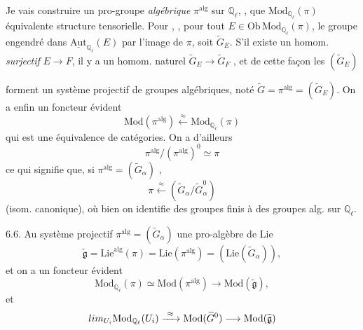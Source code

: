 \documentclass[11pt,a4paper]{article}
\begin{document}
 Je vais construire un pro-groupe \emph{algébrique} 
$\pi^{\mathrm{alg}}$ sur $\mathbb{Q}_\ell$,
\struck{$\pi$} ,  que $\mathrm{Mod}_{\mathbb{Q}_\ell}(\pi)$
 équivalente \ill{} structure tensorielle. Pour ,
\ill{} , pour tout $E \in \mathrm{Ob}\,\mathrm{Mod}_{\mathbb{Q}_\ell}(\pi)$,
le groupe  engendré dans $\underline{\mathrm{Aut}}_{\mathbb{Q}_\ell}(E)$
par l'image de $\pi$, soit $\widetilde{G}_E$. S'il existe un homom.
\emph{surjectif} $E \to F$, il y a un homom. naturel $\widetilde{G}_E \to \widetilde{G}_F$
, et de cette façon les $(\widetilde{G}_E)$

forment un système projectif de groupes algébriques, noté
$\widetilde{G} = \pi^{\mathrm{alg}} = (\widetilde{G}_E)$. On a enfin un foncteur évident
\[
  \mathrm{Mod}(\pi^{\mathrm{alg}}) \xleftarrow{\ \approx\ } \mathrm{Mod}_{\mathbb{Q}_\ell}(\pi)
\]
qui est une équivalence de catégories. On a d'ailleurs
\[
  \pi^{\mathrm{alg}}/(\pi^{\mathrm{alg}})^{0} \simeq \pi
\]
ce qui signifie que, si $\pi^{\mathrm{alg}} = (\widetilde{G}_\alpha)$
, \ill{}
\[
  \pi \xleftarrow{\ \approx\ } (\widetilde{G}_\alpha/\widetilde{G}_\alpha^{0})
\]
(isom. canonique), où bien  on identifie des groupes finis à des
groupes alg. sur $\mathbb{Q}_\ell$.

6.6. Au système projectif $\pi^{\mathrm{alg}} = (\widetilde{G}_\alpha)$
 une pro-algèbre de Lie
\[
  \widetilde{\mathfrak{g}} = \mathrm{Lie}^{\mathrm{alg}}(\pi) = \mathrm{Lie}(\pi^{\mathrm{alg}}) = (\mathrm{Lie}(\widetilde{G}_\alpha)),
\]
et on a un foncteur évident
\[
  \mathrm{Mod}_{\mathbb{Q}_\ell}(\pi) \simeq \mathrm{Mod}(\pi^{\mathrm{alg}}) \longrightarrow \mathrm{Mod}(\widetilde{\mathfrak{g}}),
\]
 et 
\[
  \varinjlim_{U_i} \mathrm{Mod}_{\mathbb{Q}_\ell}(U_i) \xrightarrow{\ \approx\ } \mathrm{Mod}(\widetilde{G}^{0}) \longrightarrow \mathrm{Mod}(\widetilde{\mathfrak{g}})
\]
\end{document}
